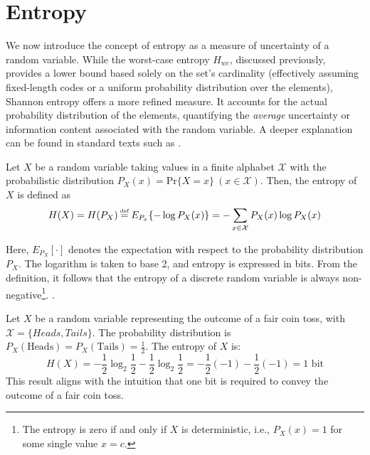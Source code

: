 \section{Entropy} \label{sec:shannon_entropy}

We now introduce the concept of entropy as a measure of uncertainty of a random variable. While the worst-case entropy $H_{wc}$, discussed previously, provides a lower bound based solely on the set's cardinality (effectively assuming fixed-length codes or a uniform probability distribution over the elements), Shannon entropy offers a more refined measure. It accounts for the actual probability distribution of the elements, quantifying the \emph{average} uncertainty or information content associated with the random variable. A deeper explanation can be found in standard texts such as \cite{han2002mathematics,navarro2016compact,ElementsofInformationTheory}.

\begin{definition}\label{def:entropy}
    Let $X$ be a random variable taking values in a finite alphabet $\mathcal{X}$ with the probabilistic distribution $P_X(x)= \text{Pr}\{X=x\}~(x\in\mathcal{X})$. Then, the entropy of $X$ is defined as
    \begin{equation*}
        H(X) = H(P_X) \myeq E_{P_x} \{-\log P_X(x)\} = -\sum_{x\in\mathcal{X}} P_X(x)\log P_X(x)
    \end{equation*}
\end{definition}
Here, $E_{P_X}[\cdot]$ denotes the expectation with respect to the probability distribution $P_X$. The logarithm is taken to base 2, and entropy is expressed in bits. From the definition, it follows that the entropy of a discrete random variable is always non-negative\footnote{The entropy is zero if and only if $X$ is deterministic, i.e., $P_X(x)=1$ for some single value $x=c$.}. \label{foot:entropy_nonneg}.

\begin{example}
    Let $X$ be a random variable representing the outcome of a fair coin toss, with $\mathcal{X}=\{Heads, Tails\}$. The probability distribution is $P_X(\text{Heads}) = P_X(\text{Tails}) = \frac{1}{2}$. The entropy of $X$ is:
    \begin{equation*}
        H(X) = -\frac{1}{2}\log_2\frac{1}{2} - \frac{1}{2}\log_2\frac{1}{2} = -\frac{1}{2}(-1) - \frac{1}{2}(-1) = 1 \text{ bit}
    \end{equation*}
    This result aligns with the intuition that one bit is required to convey the outcome of a fair coin toss.
\end{example}

